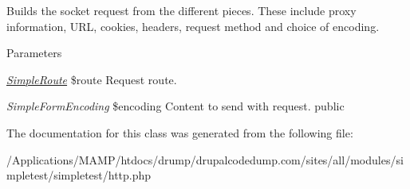 \label{class_simple_http_request_a44123ae07ac9e6dd385b107460e8f4ba}
Builds the socket request from the different pieces. These include proxy information, URL, cookies, headers, request method and choice of encoding. 
\begin{DoxyParams}{Parameters}
\item[{\em \hyperlink{class_simple_route}{SimpleRoute}}]\$route Request route. \item[{\em SimpleFormEncoding}]\$encoding Content to send with request.  public \end{DoxyParams}


The documentation for this class was generated from the following file:\begin{DoxyCompactItemize}
\item 
/Applications/MAMP/htdocs/drump/drupalcodedump.com/sites/all/modules/simpletest/simpletest/http.php\end{DoxyCompactItemize}
